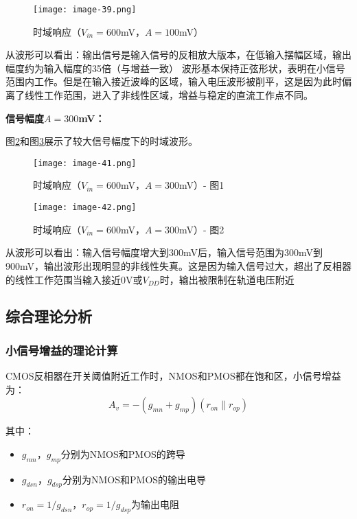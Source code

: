 \documentclass[UTF8,12pt,a4paper]{ctexart}
\begin{document}
\begin{figure}[h]
\centering
\texttt{[image: image-39.png]}
\caption{时域响应（$V_{in} = 600$mV，$A = 100$mV）}
\label{fig:task10f}
\end{figure}

从波形可以看出：输出信号是输入信号的反相放大版本，在低输入摆幅区域，输出幅度约为输入幅度的35倍（与增益一致）
波形基本保持正弦形状，表明在小信号范围内工作。但是在输入接近波峰的区域，输入电压波形被削平，这是因为此时偏离了线性工作范围，进入了非线性区域，增益与稳定的直流工作点不同。

\textbf{信号幅度$A = 300$mV：}

图\ref{fig:task10g}和图\ref{fig:task10h}展示了较大信号幅度下的时域波形。

\begin{figure}[h]
\centering
\texttt{[image: image-41.png]}
\caption{时域响应（$V_{in} = 600$mV，$A = 300$mV）- 图1}
\label{fig:task10g}
\end{figure}

\begin{figure}[h]
\centering
\texttt{[image: image-42.png]}
\caption{时域响应（$V_{in} = 600$mV，$A = 300$mV）- 图2}
\label{fig:task10h}
\end{figure}

从波形可以看出：输入信号幅度增大到300mV后，输入信号范围为300mV到900mV，输出波形出现明显的非线性失真。这是因为输入信号过大，超出了反相器的线性工作范围当输入接近0V或$V_{DD}$时，输出被限制在轨道电压附近


\subsection{综合理论分析}

\subsubsection{小信号增益的理论计算}
CMOS反相器在开关阈值附近工作时，NMOS和PMOS都在饱和区，小信号增益为：
\begin{equation}
A_v = -(g_{mn} + g_{mp})(r_{on} \| r_{op})
\end{equation}

其中：
\begin{itemize}
\item $g_{mn}$，$g_{mp}$分别为NMOS和PMOS的跨导
\item $g_{dsn}$，$g_{dsp}$分别为NMOS和PMOS的输出电导
\item $r_{on} = 1/g_{dsn}$，$r_{op} = 1/g_{dsp}$为输出电阻
\end{itemize}
\end{document}
